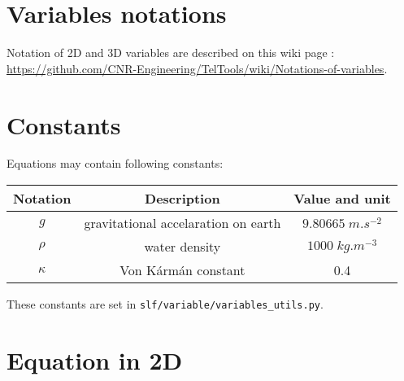 \documentclass{article}
\begin{document}
\thispagestyle{empty}


\section{Variables notations}

Notation of 2D and 3D variables are described on this wiki page : \url{https://github.com/CNR-Engineering/TelTools/wiki/Notations-of-variables}.

\section{Constants}

Equations may contain following constants:

\begin{center}
  \begin{tabular}{ | c | c | c | }
    \hline
    Notation  & Description & Value and unit \\
    \hline
    $g$      & gravitational accelaration on earth & $9.80665 \; m.s^{-2}$ \\
    $\rho$   & water density                       & $1000 \; kg.m^{-3}$ \\
    $\kappa$ & Von Kármán constant                 & 0.4 \\
    \hline
  \end{tabular}
\end{center}

These constants are set in \texttt{slf/variable/variables\_utils.py}.

\section{Equation in 2D}
\end{document}
